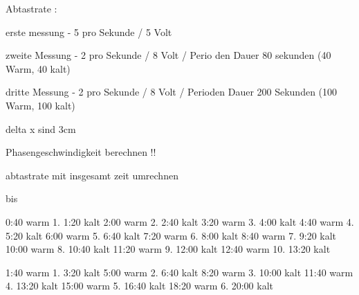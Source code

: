 Abtastrate :

    erste messung - 5 pro Sekunde  / 5 Volt 


    zweite Messung - 2 pro Sekunde / 8 Volt / Perio  den Dauer 80 sekunden (40 Warm, 40 kalt)

    dritte Messung - 2 pro Sekunde / 8 Volt / Perioden Dauer 200 Sekunden (100 Warm, 100 kalt)

    delta x sind 3cm
    

Phasengeschwindigkeit berechnen !!

abtastrate mit insgesamt zeit umrechnen

bis

0:40 warm 1.
1:20 kalt
2:00 warm 2.
2:40 kalt
3:20 warm 3.
4:00 kalt
4:40 warm 4.
5:20 kalt
6:00 warm 5.
6:40 kalt
7:20 warm 6. 
8:00 kalt 
8:40 warm 7.
9:20 kalt 
10:00 warm 8. 
10:40 kalt 
11:20 warm 9.
12:00 kalt
12:40 warm 10.
13:20 kalt


1:40 warm 1.
3:20 kalt
5:00 warm 2.
6:40 kalt
8:20 warm 3.
10:00 kalt
11:40 warm 4.
13:20 kalt
15:00 warm 5.
16:40 kalt
18:20 warm 6. 
20:00 kalt 


